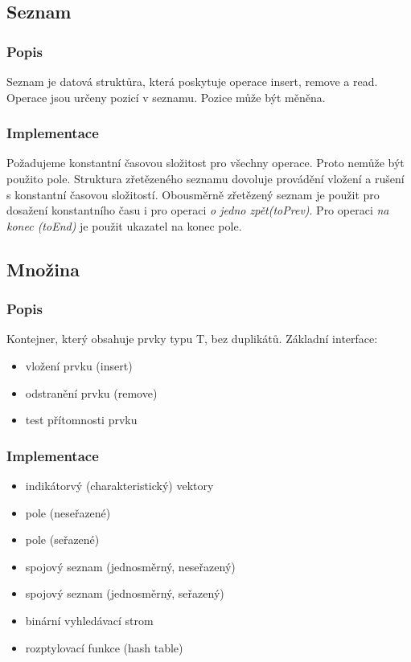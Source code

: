 \documentclass{szzclass}
\begin{document}
\subsection{Seznam}
\subsubsection{Popis}
Seznam je datová struktůra, která poskytuje operace insert, remove a read. Operace jsou určeny pozicí v seznamu. Pozice může být měněna.
\subsubsection{Implementace}
Požadujeme konstantní časovou složitost pro všechny operace. Proto nemůže být použito pole. Struktura zřetězeného seznamu dovoluje provádění vložení
a rušení s konstantní časovou složitostí. Obousměrně zřetězený seznam je použit pro dosažení konstantního času i pro operaci \textit{o jedno zpět(toPrev)}.
Pro operaci \textit{na konec (toEnd)} je použit ukazatel na konec pole.

\subsection{Množina}
\subsubsection{Popis}
Kontejner, který obsahuje prvky typu T, bez duplikátů. Základní interface:
\begin{itemize}
    \item vložení prvku (insert)
    \item odstranění prvku (remove)
    \item test přítomnosti prvku
\end{itemize}
\subsubsection{Implementace}
\begin{itemize}
    \item indikátorvý (charakteristický) vektory
    \item pole (neseřazené)
    \item pole (seřazené)
    \item spojový seznam (jednosměrný, neseřazený)
    \item spojový seznam (jednosměrný, seřazený)
    \item binární vyhledávací strom
    \item rozptylovací funkce (hash table)
\end{itemize}
\end{document}
